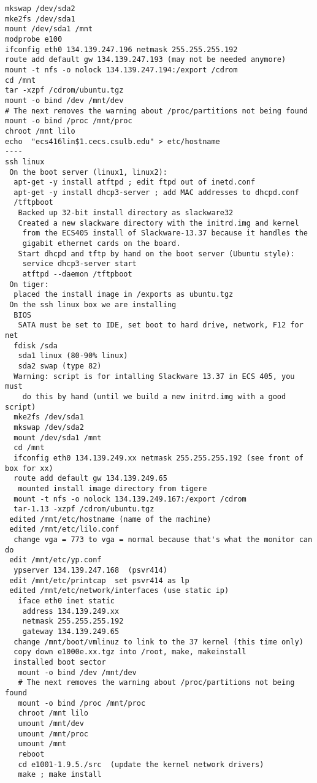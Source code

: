 \begin{verbatim}
mkswap /dev/sda2
mke2fs /dev/sda1
mount /dev/sda1 /mnt
modprobe e100
ifconfig eth0 134.139.247.196 netmask 255.255.255.192
route add default gw 134.139.247.193 (may not be needed anymore)
mount -t nfs -o nolock 134.139.247.194:/export /cdrom
cd /mnt
tar -xzpf /cdrom/ubuntu.tgz
mount -o bind /dev /mnt/dev
# The next removes the warning about /proc/partitions not being found
mount -o bind /proc /mnt/proc
chroot /mnt lilo
echo  "ecs416lin$1.cecs.csulb.edu" > etc/hostname
----
ssh linux
 On the boot server (linux1, linux2):
  apt-get -y install atftpd ; edit ftpd out of inetd.conf
  apt-get -y install dhcp3-server ; add MAC addresses to dhcpd.conf
  /tftpboot
   Backed up 32-bit install directory as slackware32
   Created a new slackware directory with the initrd.img and kernel 
    from the ECS405 install of Slackware-13.37 because it handles the
    gigabit ethernet cards on the board.
   Start dhcpd and tftp by hand on the boot server (Ubuntu style):
    service dhcp3-server start
    atftpd --daemon /tftpboot
 On tiger:
  placed the install image in /exports as ubuntu.tgz
 On the ssh linux box we are installing
  BIOS
   SATA must be set to IDE, set boot to hard drive, network, F12 for net
  fdisk /sda
   sda1 linux (80-90% linux)
   sda2 swap (type 82)
  Warning: script is for intalling Slackware 13.37 in ECS 405, you must
    do this by hand (until we build a new initrd.img with a good script)
  mke2fs /dev/sda1
  mkswap /dev/sda2
  mount /dev/sda1 /mnt
  cd /mnt
  ifconfig eth0 134.139.249.xx netmask 255.255.255.192 (see front of box for xx)
  route add default gw 134.139.249.65
   mounted install image directory from tigere
  mount -t nfs -o nolock 134.139.249.167:/export /cdrom
  tar-1.13 -xzpf /cdrom/ubuntu.tgz
 edited /mnt/etc/hostname (name of the machine)
 edited /mnt/etc/lilo.conf
  change vga = 773 to vga = normal because that's what the monitor can do
 edit /mnt/etc/yp.conf
  ypserver 134.139.247.168  (psvr414)
 edit /mnt/etc/printcap  set psvr414 as lp
 edited /mnt/etc/network/interfaces (use static ip)
   iface eth0 inet static
    address 134.139.249.xx
    netmask 255.255.255.192
    gateway 134.139.249.65
  change /mnt/boot/vmlinuz to link to the 37 kernel (this time only)
  copy down e1000e.xx.tgz into /root, make, makeinstall
  installed boot sector
   mount -o bind /dev /mnt/dev
   # The next removes the warning about /proc/partitions not being found
   mount -o bind /proc /mnt/proc
   chroot /mnt lilo
   umount /mnt/dev
   umount /mnt/proc
   umount /mnt
   reboot
   cd e1001-1.9.5./src  (update the kernel network drivers)
   make ; make install
\end{verbatim} 
